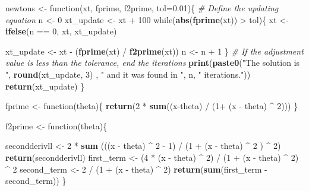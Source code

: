 \documentclass[]{article}
\newenvironment{Shaded}{\begin{snugshade}}{\end{snugshade}}
\newcommand{\KeywordTok}[1]{\textcolor[rgb]{0.13,0.29,0.53}{\textbf{{#1}}}}
\newcommand{\DataTypeTok}[1]{\textcolor[rgb]{0.13,0.29,0.53}{{#1}}}
\newcommand{\DecValTok}[1]{\textcolor[rgb]{0.00,0.00,0.81}{{#1}}}
\newcommand{\FloatTok}[1]{\textcolor[rgb]{0.00,0.00,0.81}{{#1}}}
\newcommand{\StringTok}[1]{\textcolor[rgb]{0.31,0.60,0.02}{{#1}}}
\newcommand{\CommentTok}[1]{\textcolor[rgb]{0.56,0.35,0.01}{\textit{{#1}}}}
\newcommand{\NormalTok}[1]{{#1}}
\begin{document}
\begin{Shaded}
\begin{Highlighting}[]
\NormalTok{newtons <-}\StringTok{ }\NormalTok{function(xt, fprime, f2prime, }\DataTypeTok{tol=}\FloatTok{0.01}\NormalTok{)\{}
  \CommentTok{# Define the updating equation}
  \NormalTok{n <-}\StringTok{ }\DecValTok{0}
  \NormalTok{xt_update <-}\StringTok{ }\NormalTok{xt +}\StringTok{ }\DecValTok{100}  
  \NormalTok{while(}\KeywordTok{abs}\NormalTok{(}\KeywordTok{fprime}\NormalTok{(xt)) >}\StringTok{ }\NormalTok{tol)\{}
    \NormalTok{xt <-}\StringTok{ }\KeywordTok{ifelse}\NormalTok{(n ==}\StringTok{ }\DecValTok{0}\NormalTok{, xt, xt_update)}
    
    \NormalTok{xt_update <-}\StringTok{ }\NormalTok{xt -}\StringTok{ }\NormalTok{(}\KeywordTok{fprime}\NormalTok{(xt) /}\StringTok{ }\KeywordTok{f2prime}\NormalTok{(xt))}
    \NormalTok{n <-}\StringTok{ }\NormalTok{n +}\StringTok{ }\DecValTok{1}
  \NormalTok{\}}
  \CommentTok{# If the adjustment value is less than the tolerance, end the iterations}
  \KeywordTok{print}\NormalTok{(}\KeywordTok{paste0}\NormalTok{(}\StringTok{"The solution is "}\NormalTok{, }\KeywordTok{round}\NormalTok{(xt_update, }\DecValTok{3}\NormalTok{) , }\StringTok{" and it was found in "}\NormalTok{, n, }\StringTok{" iterations."}\NormalTok{))}
  \KeywordTok{return}\NormalTok{(xt_update)}
\NormalTok{\}}

\NormalTok{fprime <-}\StringTok{ }\NormalTok{function(theta)\{}
  \KeywordTok{return}\NormalTok{(}\DecValTok{2} \NormalTok{*}\StringTok{ }\KeywordTok{sum}\NormalTok{((x-theta) /}\StringTok{ }\NormalTok{(}\DecValTok{1}\NormalTok{+}\StringTok{ }\NormalTok{(x -}\StringTok{ }\NormalTok{theta) ^}\StringTok{ }\DecValTok{2}\NormalTok{)))}
\NormalTok{\}}

\NormalTok{f2prime <-}\StringTok{ }\NormalTok{function(theta)\{}
  
  \NormalTok{secondderivll <-}\StringTok{  }\DecValTok{2} \NormalTok{*}\StringTok{ }\KeywordTok{sum} \NormalTok{(((x -}\StringTok{ }\NormalTok{theta) ^}\StringTok{ }\DecValTok{2} \NormalTok{-}\StringTok{ }\DecValTok{1}\NormalTok{) /}\StringTok{ }\NormalTok{(}\DecValTok{1} \NormalTok{+}\StringTok{ }\NormalTok{(x -}\StringTok{ }\NormalTok{theta) ^}\StringTok{ }\DecValTok{2} \NormalTok{) ^}\StringTok{ }\DecValTok{2}\NormalTok{)}
  \KeywordTok{return}\NormalTok{(secondderivll)  }
  \NormalTok{first_term <-}\StringTok{ }\NormalTok{(}\DecValTok{4} \NormalTok{*}\StringTok{ }\NormalTok{(x -}\StringTok{ }\NormalTok{theta) ^}\StringTok{ }\DecValTok{2}\NormalTok{) /}\StringTok{ }\NormalTok{(}\DecValTok{1} \NormalTok{+}\StringTok{ }\NormalTok{(x -}\StringTok{ }\NormalTok{theta) ^}\StringTok{ }\DecValTok{2}\NormalTok{) ^}\StringTok{ }\DecValTok{2}
  \NormalTok{second_term <-}\StringTok{ }\DecValTok{2} \NormalTok{/}\StringTok{ }\NormalTok{(}\DecValTok{1} \NormalTok{+}\StringTok{ }\NormalTok{(x -}\StringTok{ }\NormalTok{theta) ^}\StringTok{ }\DecValTok{2}\NormalTok{)}
  \KeywordTok{return}\NormalTok{(}\KeywordTok{sum}\NormalTok{(first_term -}\StringTok{ }\NormalTok{second_term))}
\NormalTok{\}}



\end{Highlighting}
\end{Shaded}
\end{document}
